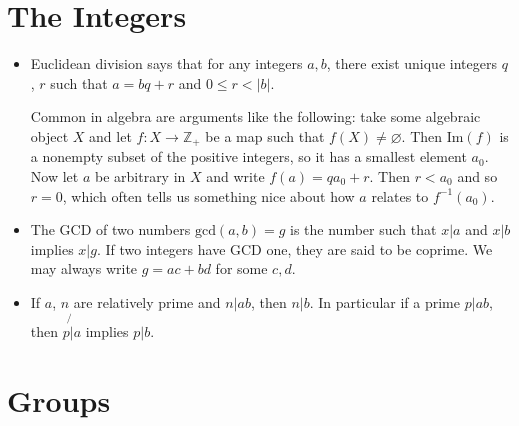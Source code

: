 \documentclass{article}
\begin{document}
\section{The Integers}
\begin{itemize}
  \item{
    Euclidean division says that for any integers $a, b$, there exist unique
    integers $q$, $r$ such that $a = bq + r$ and $0 \leq r < |b|$.

    Common in algebra are arguments like the following: take some algebraic
    object $X$ and let $f: X \to \mathbb{Z}_+$ be a map such that
    $f(X) \neq \varnothing$. Then $\mathrm{Im}(f)$ is a nonempty
    subset of the positive integers, so it has a smallest element
    $a_0$. Now let $a$ be arbitrary in $X$ and write
    $f(a) = q a_0 + r$. Then $r < a_0$ and so $r = 0$, which often
    tells us something nice about how $a$ relates to $f^{-1}(a_0)$.
  }
  \item{
    The GCD of two numbers $\mathrm{gcd}(a, b) = g$ is the number such
    that $x \vert a$ and $x \vert b$ implies $x \vert g$. If two
    integers have GCD one, they are said to be coprime. We may always
    write $g = ac + bd$ for some $c, d$.
  }
  \item{
    If $a$, $n$ are relatively prime and $n \vert ab$, then $n \vert
    b$. In particular if a prime $p \vert ab$, then $p \not{\vert} a$
    implies $p \vert b$.
  }
\end{itemize}

\section{Groups}
\end{document}
